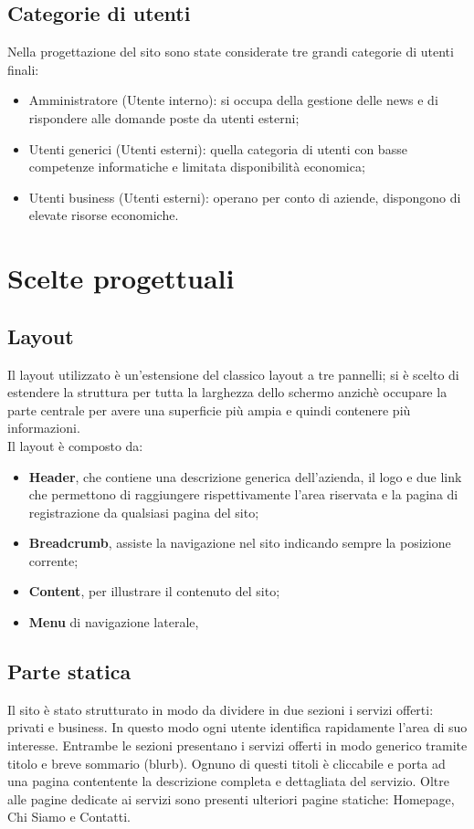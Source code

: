 \documentclass[a4paper]{article}
\begin{document}
\subsection{Categorie di utenti}
Nella progettazione del sito sono state considerate tre grandi categorie di utenti finali:
\begin{itemize}
	\item Amministratore (Utente interno): si occupa della gestione delle news e di rispondere alle domande poste da utenti esterni;
	\item Utenti generici (Utenti esterni): quella categoria di utenti con basse competenze informatiche e limitata disponibilità economica;
	\item Utenti business (Utenti esterni): operano per conto di aziende, dispongono di elevate risorse economiche. 
\end{itemize}

\section{Scelte progettuali}%
\subsection{Layout}
Il layout utilizzato è un'estensione del classico layout a tre pannelli; si è scelto di estendere la struttura per tutta la larghezza dello schermo anzichè occupare la parte centrale per avere una superficie più ampia e quindi contenere più informazioni.\\
Il layout è composto da: 
\begin{itemize}
 \item \textbf{Header}, che contiene una descrizione generica dell'azienda, il logo e due link che permettono di raggiungere rispettivamente l'area riservata e la pagina di registrazione da qualsiasi pagina del sito;
 \item \textbf{Breadcrumb}, assiste la navigazione nel sito indicando sempre la posizione corrente;
 \item \textbf{Content}, per illustrare il contenuto del sito;
 \item \textbf{Menu} di navigazione laterale,
\end{itemize}

\subsection{Parte statica}
Il sito è stato strutturato in modo da dividere in due sezioni i servizi offerti: privati e business. In questo modo ogni utente identifica rapidamente l'area di suo interesse.
Entrambe le sezioni presentano i servizi offerti in modo generico tramite titolo e breve sommario (blurb). Ognuno di questi titoli è cliccabile e porta ad una pagina contentente la descrizione completa e dettagliata del servizio.
Oltre alle pagine dedicate ai servizi sono presenti ulteriori pagine statiche: Homepage, Chi Siamo e Contatti. 
\end{document}
